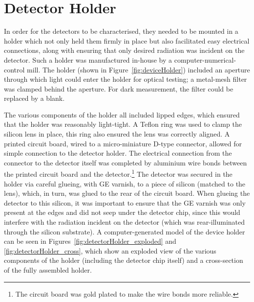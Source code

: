 \section{Detector Holder}\label{sec:detectorHolder}
In order for the detectors to be characterised, they needed to be mounted in a holder which not only held them firmly in place but also facilitated easy electrical connections, along with ensuring that only desired radiation was incident on the detector. Such a holder was manufactured in-house by a computer-numerical-control mill. The holder (shown in Figure~\ref{fig:deviceHolder}) included an aperture through which light could enter the holder for optical testing; a metal-mesh filter was clamped behind the aperture. For dark measurement, the filter could be replaced by a blank.
\par 
The various components of the holder all included lipped edges, which ensured that the holder was reasonably light-tight. A Teflon ring was used to clamp the silicon lens in place, this ring also ensured the lens was correctly aligned. A printed circuit board, wired to a micro-miniature D-type connector, allowed for simple connection to the detector holder. The electrical connection from the connector to the detector itself was completed by aluminium wire bonds between the printed circuit board and the detector.\footnote{The circuit board was gold plated to make the wire bonds more reliable.} The detector was secured in the holder via careful glueing, with GE varnish, to a piece of silicon (matched to the lens), which, in turn, was glued to the rear of the circuit board. When glueing the detector to this silicon, it was important to ensure that the GE varnish was only present at the edges and did not seep under the detector chip, since this would interfere with the radiation incident on the detector (which was rear-illuminated through the silicon substrate). A computer-generated model of the device holder can be seen in Figures~\ref{fig:detectorHolder_exploded} and \ref{fig:detectorHolder_cross}, which show an exploded view of the various components of the holder (including the detector chip itself) and a cross-section of the fully assembled holder.
